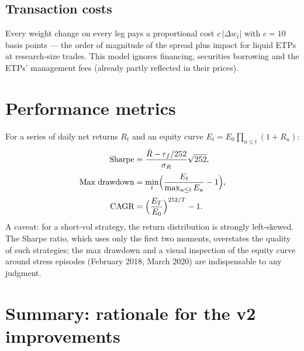 \documentclass[11pt,a4paper]{article}
\begin{document}
\subsection{Transaction costs}

Every weight change on every leg pays a proportional cost $c\,|\Delta w_t|$
with $c = 10$ basis points --- the order of magnitude of the spread plus
impact for liquid ETPs at research-size trades. This model ignores financing,
securities borrowing and the ETPs' management fees (already partly reflected
in their prices).

\section{Performance metrics}

For a series of daily net returns $R_t$ and an equity curve
$E_t = E_0\prod_{u\le t}(1+R_u)$:
\begin{align}
\text{Sharpe} &= \frac{\bar{R} - r_f/252}{\sigma_R}\sqrt{252},\\[2pt]
\text{Max drawdown} &= \min_t \Bigl(\frac{E_t}{\max_{u\le t}E_u} - 1\Bigr),\\[2pt]
\text{CAGR} &= \Bigl(\frac{E_T}{E_0}\Bigr)^{252/T} - 1 .
\end{align}
A caveat: for a short-vol strategy, the return distribution is strongly
left-skewed. The Sharpe ratio, which uses only the first two moments,
overstates the quality of such strategies; the max drawdown and a visual
inspection of the equity curve around stress episodes (February 2018,
March 2020) are indispensable to any judgment.

\section{Summary: rationale for the v2 improvements}
\end{document}
